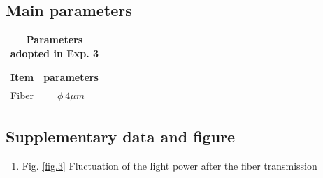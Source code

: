 \documentclass[12pt,a4paper,UTF8]{article}
\begin{document}
    \subsection{Main parameters}
    \begin{table}[htbp]
        \centering
            \begin{tabular}{cc}
                \toprule
                Item &parameters  \\
                \midrule
                Fiber &$\phi \ 4 \mu m$ \\
                \bottomrule
            \end{tabular}
            \caption{\textbf{Parameters adopted in Exp. 3}}
            \label{tab.3.0}
    \end{table}	

    \subsection{Supplementary data and figure}
    \begin{enumerate}[label=\arabic*.]
        \item Fig. \ref{fig.3} Fluctuation of the light power after the fiber transmission
    \end{enumerate}
\end{document}
